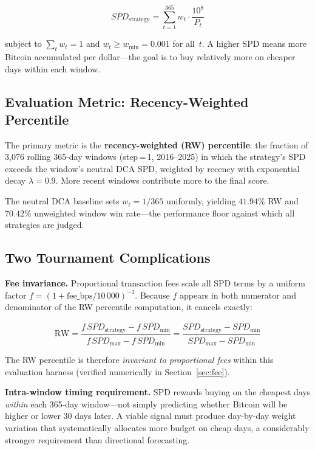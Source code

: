\documentclass[11pt,letterpaper]{article}
\begin{document}
\begin{equation}
  \overline{SPD}_{\text{strategy}} = \sum_{t=1}^{365} w_t \cdot \frac{10^8}{P_t}
  \label{eq:strategy_spd}
\end{equation}

subject to $\sum_t w_t = 1$ and $w_t \geq w_{\min} = 0.001$ for all~$t$.  A
higher SPD means more Bitcoin accumulated per dollar---the goal is to buy
relatively more on cheaper days within each window.

\subsection{Evaluation Metric: Recency-Weighted Percentile}

The primary metric is the \textbf{recency-weighted (RW) percentile}: the fraction
of 3,076 rolling 365-day windows (step\,=\,1, 2016--2025) in which the strategy's
SPD exceeds the window's neutral DCA SPD, weighted by recency with exponential
decay $\lambda = 0.9$.  More recent windows contribute more to the final score.

The neutral DCA baseline sets $w_t = 1/365$ uniformly, yielding
$41.94\%$ RW and $70.42\%$ unweighted window win rate---the performance floor
against which all strategies are judged.

\subsection{Two Tournament Complications}

\textbf{Fee invariance.}  Proportional transaction fees scale all SPD terms by a
uniform factor $f = (1 + \text{fee\_bps}/10\,000)^{-1}$.  Because $f$ appears in
both numerator and denominator of the RW percentile computation, it cancels
exactly:

\begin{equation}
  \text{RW} =
    \frac{f\,\overline{SPD}_{\text{strategy}} - f\,\overline{SPD}_{\min}}
         {f\,\overline{SPD}_{\max} - f\,\overline{SPD}_{\min}}
  = \frac{\overline{SPD}_{\text{strategy}} - \overline{SPD}_{\min}}
         {\overline{SPD}_{\max} - \overline{SPD}_{\min}}
\end{equation}

The RW percentile is therefore \emph{invariant to proportional fees} within this
evaluation harness (verified numerically in Section~\ref{sec:fee}).

\textbf{Intra-window timing requirement.}  SPD rewards buying on the cheapest
days \emph{within} each 365-day window---not simply predicting whether Bitcoin
will be higher or lower 30 days later.  A viable signal must produce day-by-day
weight variation that systematically allocates more budget on cheap days, a
considerably stronger requirement than directional forecasting.
\end{document}
